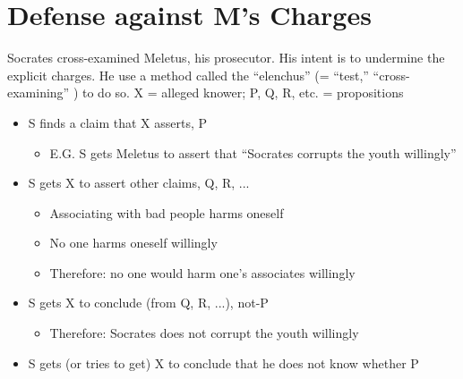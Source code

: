 \documentclass[oneside]{article}
\begin{document}
\section*{Defense against M's Charges}
Socrates cross-examined Meletus, his prosecutor. His intent is to undermine the explicit charges.  He use a method called the ``elenchus'' (= ``test,'' ``cross-examining'' ) to do so.
\noindent X = alleged knower; P, Q, R, etc. = propositions
\begin{itemize}
\item{S finds a claim that X asserts, P}\begin{itemize}\item{E.G. S gets Meletus to assert that ``Socrates corrupts the youth willingly''}\end{itemize}
\item{S gets X to assert other claims, Q, R, ...}
\begin{itemize}\item{Associating with bad people harms oneself}\item{No one harms oneself willingly}\item{Therefore: no one would harm one's associates willingly}\end{itemize}

\item{S gets X to conclude (from Q, R, ...), not-P}\begin{itemize}\item{Therefore: Socrates does not corrupt the youth willingly}\end{itemize}

\item{S gets (or tries to get) X to conclude that he does not know whether P}
\end{itemize}

\end{document}
